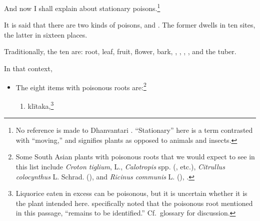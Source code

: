\begin{translation}
    
\item[1]

And now I shall explain 
about stationary poisons.\footnote{No reference is made to
    Dhanvantari \citep[see][]{birc-2021}. “Stationary” here is a term
    contrasted with “moving,” and signifies plants as opposed to animals
    and insects.}
  
    \item[3]
    \noindent It is said that there are two kinds of poisons,
     and . The former
    dwells in ten sites, the latter in sixteen places.
   
    \item[4]
    Traditionally, the ten are: root, leaf, fruit, flower, bark,
    , , , 
    , and the tuber.

    \item[5]
    
    In that context,\label{poisonousplants}
    \begin{itemize}
        \item[A] The eight items with poisonous roots are:\footnote{Some South 
        Asian
    plants with poisonous roots that we would expect to see in
    this list include \emph{Croton tiglium}, L., \emph{Calotropis}
    spp. (, etc.), \emph{Citrullus colocynthus} L. Schrad. 
    (), and
    \emph{Ricinus communis} L. (), \citep{pill-2010}.} %
        \begin{enumerate}
            
        \item  \gls{klītaka},\footnote{Liquorice eaten in excess can
    be poisonous, but it is uncertain whether it is the plant intended
    here.  \citet[124]{gvdb} specifically noted that the poisonous root
    mentioned in this passage, “remains to be identified.” Cf.\ glossary for 
    discussion.}
       

\end{enumerate}
\end{itemize}
\end{translation}
